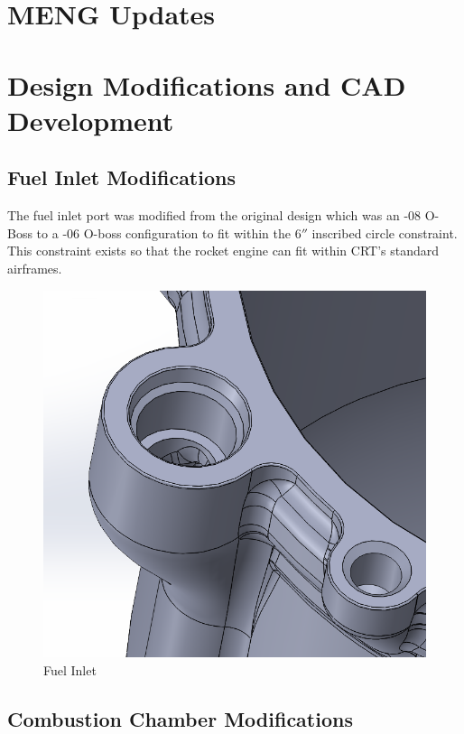 \section{MENG Updates}
\section{Design Modifications and CAD Development}

\subsection{Fuel Inlet Modifications}

The fuel inlet port was modified from the original design which was an -08 O-Boss to a -06 O-boss configuration to fit within the $6''$ inscribed circle constraint. This constraint exists so that the rocket engine can fit within CRT's standard airframes. 
\begin{figure}
    \centering
    \includegraphics[width=0.5\linewidth]{Images/fuelinlet.png}
    \caption{Fuel Inlet}
    \label{fig:enter-label}
\end{figure}
\subsection{Combustion Chamber Modifications}

